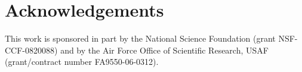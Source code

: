 \documentclass{llncs}
\begin{document}




 

 

%



\section{Acknowledgements}
This work is sponsored in part by the National Science Foundation 
(grant NSF-CCF-0820088) and by the Air Force Office of Scientific Research, 
USAF (grant/contract number FA9550-06-0312).

%



\end{document}
